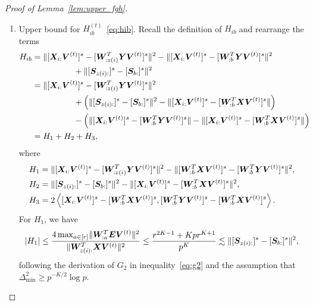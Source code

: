\documentclass[lettersize,onecolumn,journal]{IEEEtran}
\theoremstyle{definition}
\theoremstyle{definition}
\newcommand{\of}[1]{\left(#1\right)}
\newcommand{\ang}[1]{\left\langle#1\right\rangle}
\begin{document}
\begin{proof}[Proof of Lemma~\ref{lem:upper_fgh}]
\begin{enumerate}
    \item Upper bound for $H_{ib}^{(t)}$~\eqref{eq:hib}. Recall the definition of $H_{ib}$ and rearrange the terms
    \begin{align}
        H_{ib} &= \onormSize{}{ [\mX_{i:} \mV^{(t)}]^s -  [  \mW_{:z(i)}^T \mY \mV^{(t)} ]^s}^2 - \onormSize{}{ [\mX_{i:} \mV^{(t)}]^s -  [  \mW_{:b}^T \mY \mV^{(t)} ]^s}^2\\
        & \quad \quad \quad \quad \quad + \onormSize{}{ [ \mS_{z(i):}  ]^s - [ \mS_{b:}  ]^s  }^2 \\
        & =  \onormSize{}{ [ \mX_{i:} \mV^{(t)}]^s -  [  \mW_{:z(i)}^T \mY \mV^{(t)} ]^s}^2 \\
        & \quad \quad \quad \quad \quad + \of{ \onormSize{}{ [ \mS_{z(i):}  ]^s - [ \mS_{b:}  ]^s  }^2 - \onormSize{}{ [\mX_{i:} \mV^{(t)}]^s-  [  \mW_{:b}^T \mX \mV^{(t)} ]^s }  } \\
        & \quad \quad \quad \quad \quad  - \of{\onormSize{}{ [\mX_{i:} \mV^{(t)}]^s-  [  \mW_{:b}^T \mY \mV^{(t)} ]^s } -  \onormSize{}{ [\mX_{i:} \mV^{(t)}]^s-  [  \mW_{:b}^T \mX \mV^{(t)} ]^s }   } \\
        & = H_1 + H_2 + H_3,
    \end{align}
    where 
    \begin{align}
        H_1 &= \onormSize{}{ [ \mX_{i:} \mV^{(t)}]^s -  [  \mW_{:z(i)}^T \mY \mV^{(t)} ]^s}^2 - \onormSize{}{ [ \mW_{:b}^T \mX \mV^{(t)}]^s -  [ \mW_{:b}^T \mY \mV^{(t)}]^s}^2, \\
        H_2 &=  \onormSize{}{ [ \mS_{z(i):}  ]^s - [ \mS_{b:}  ]^s  }^2 - \onormSize{}{ [\mX_{i:} \mV^{(t)}]^s-  [  \mW_{:b}^T \mX \mV^{(t)} ]^s }^2  , \\
        H_3 & = 2 \ang{  [\mX_{i:} \mV^{(t)}]^s  -  [  \mW_{:b}^T \mX \mV^{(t)} ]^s,  [  \mW_{:b}^T \mY \mV^{(t)} ]^s -  [  \mW_{:b}^T \mX \mV^{(t)} ]^s }.
    \end{align}
    For $H_1$, we have 
    \begin{align}
        |H_1| \leq  \frac{4 \max_{a \in [r]}\onormSize{}{ \mW_{:a}^T \mE \mV^{(t)} }^2 }{ \onormSize{}{ \mW_{z(i):}^T\mX \mV^{(t)}}^2}
         \leq  \frac{ r^{2K-1} + K p r^{K+1} }{p^{K}} 
        \lesssim  \onormSize{}{ [ \mS_{z(i):}  ]^s - [ \mS_{b:}  ]^s  }^2\label{eq:h1},
    \end{align}
    following the derivation of $G_2$ in inequality~\eqref{eq:g2} and the assumption that $\Delta_{\min}^2 \geq p^{-K/2} \log p$.

\end{enumerate}
\end{proof}
\end{document}
